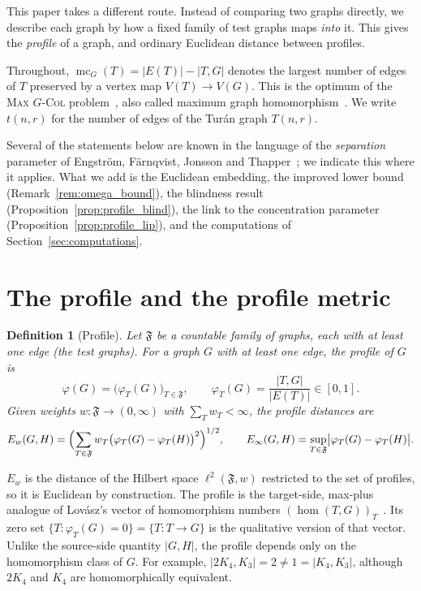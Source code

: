 \documentclass{article}
\newtheorem{definition}[theorem]{Definition}
\begin{document}
This paper takes a different route.  Instead of comparing two graphs
directly, we describe each graph by how a fixed family of test graphs maps
\emph{into} it.  This gives the \emph{profile} of a graph, and ordinary
Euclidean distance between profiles.

Throughout, $\operatorname{mc}_G(T)=|E(T)|-|T,G|$ denotes the largest number
of edges of $T$ preserved by a vertex map $V(T)\to V(G)$.  This is the
optimum of the \textsc{Max $G$-Col} problem~\cite{fjt2009,efjt2015}, also
called maximum graph homomorphism~\cite{lrs2006}.  We write $t(n,r)$ for
the number of edges of the Tur\'an graph $T(n,r)$.

Several of the statements below are known in the language of the
\emph{separation} parameter of Engstr\"om, F\"arnqvist, Jonsson and
Thapper~\cite{efjt2015}; we indicate this where it applies.  What we add is
the Euclidean embedding, the improved lower bound
(Remark~\ref{rem:omega_bound}), the blindness result
(Proposition~\ref{prop:profile_blind}), the link to the concentration
parameter (Proposition~\ref{prop:profile_lip}), and the computations of
Section~\ref{sec:computations}.

\section{The profile and the profile metric}
\label{sec:profile}

\begin{definition}[Profile]
\label{def:profile}
Let $\mathfrak F$ be a countable family of graphs, each with at least one
edge (the \emph{test graphs}).  For a graph $G$ with at least one edge, the
\emph{profile} of $G$ is
\[
  \varphi(G)=\bigl(\varphi_T(G)\bigr)_{T\in\mathfrak F},\qquad
  \varphi_T(G)=\frac{|T,G|}{|E(T)|}\in[0,1].
\]
Given weights $w\colon\mathfrak F\to(0,\infty)$ with
$\sum_T w_T<\infty$, the \emph{profile distances} are
\[
  E_w(G,H)=\Bigl(\sum_{T\in\mathfrak F}w_T\bigl(\varphi_T(G)-\varphi_T(H)\bigr)^2\Bigr)^{1/2},
  \qquad
  E_\infty(G,H)=\sup_{T\in\mathfrak F}\bigl|\varphi_T(G)-\varphi_T(H)\bigr|.
\]
\end{definition}

$E_w$ is the distance of the Hilbert space $\ell^2(\mathfrak F,w)$
restricted to the set of profiles, so it is Euclidean by construction.
The profile is the target-side, max-plus analogue of Lov\'asz's vector
of homomorphism numbers $(\hom(T,G))_T$~\cite{lovasz1967,dgr2018}.  Its zero
set $\{T:\varphi_T(G)=0\}=\{T: T\to G\}$ is the qualitative version of that
vector.  Unlike the source-side quantity $|G,H|$, the profile depends only on
the homomorphism class of $G$.  For example, $|2K_4,K_3|=2\neq1=|K_4,K_3|$,
although $2K_4$ and $K_4$ are homomorphically equivalent.
\end{document}
